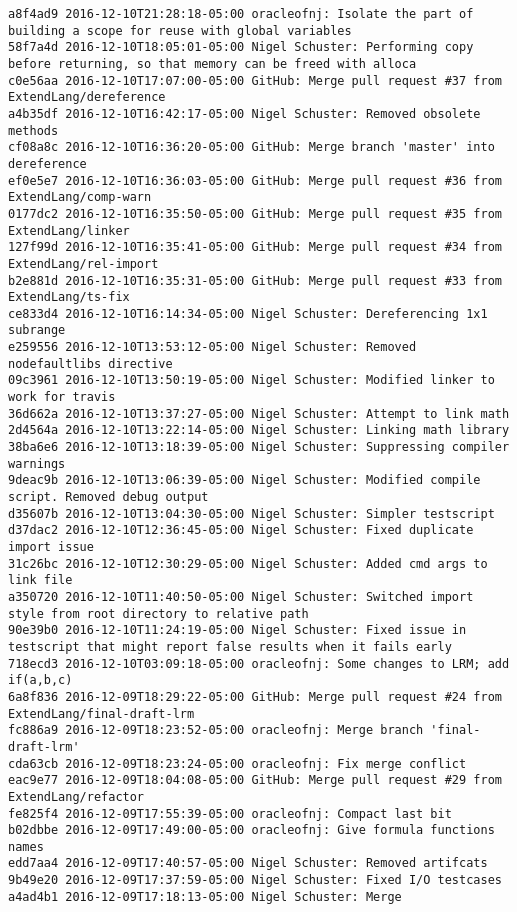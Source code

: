 \begin{lstlisting}
a8f4ad9 2016-12-10T21:28:18-05:00 oracleofnj: Isolate the part of building a scope for reuse with global variables
58f7a4d 2016-12-10T18:05:01-05:00 Nigel Schuster: Performing copy before returning, so that memory can be freed with alloca
c0e56aa 2016-12-10T17:07:00-05:00 GitHub: Merge pull request #37 from ExtendLang/dereference
a4b35df 2016-12-10T16:42:17-05:00 Nigel Schuster: Removed obsolete methods
cf08a8c 2016-12-10T16:36:20-05:00 GitHub: Merge branch 'master' into dereference
ef0e5e7 2016-12-10T16:36:03-05:00 GitHub: Merge pull request #36 from ExtendLang/comp-warn
0177dc2 2016-12-10T16:35:50-05:00 GitHub: Merge pull request #35 from ExtendLang/linker
127f99d 2016-12-10T16:35:41-05:00 GitHub: Merge pull request #34 from ExtendLang/rel-import
b2e881d 2016-12-10T16:35:31-05:00 GitHub: Merge pull request #33 from ExtendLang/ts-fix
ce833d4 2016-12-10T16:14:34-05:00 Nigel Schuster: Dereferencing 1x1 subrange
e259556 2016-12-10T13:53:12-05:00 Nigel Schuster: Removed nodefaultlibs directive
09c3961 2016-12-10T13:50:19-05:00 Nigel Schuster: Modified linker to work for travis
36d662a 2016-12-10T13:37:27-05:00 Nigel Schuster: Attempt to link math
2d4564a 2016-12-10T13:22:14-05:00 Nigel Schuster: Linking math library
38ba6e6 2016-12-10T13:18:39-05:00 Nigel Schuster: Suppressing compiler warnings
9deac9b 2016-12-10T13:06:39-05:00 Nigel Schuster: Modified compile script. Removed debug output
d35607b 2016-12-10T13:04:30-05:00 Nigel Schuster: Simpler testscript
d37dac2 2016-12-10T12:36:45-05:00 Nigel Schuster: Fixed duplicate import issue
31c26bc 2016-12-10T12:30:29-05:00 Nigel Schuster: Added cmd args to link file
a350720 2016-12-10T11:40:50-05:00 Nigel Schuster: Switched import style from root directory to relative path
90e39b0 2016-12-10T11:24:19-05:00 Nigel Schuster: Fixed issue in testscript that might report false results when it fails early
718ecd3 2016-12-10T03:09:18-05:00 oracleofnj: Some changes to LRM; add if(a,b,c)
6a8f836 2016-12-09T18:29:22-05:00 GitHub: Merge pull request #24 from ExtendLang/final-draft-lrm
fc886a9 2016-12-09T18:23:52-05:00 oracleofnj: Merge branch 'final-draft-lrm'
cda63cb 2016-12-09T18:23:24-05:00 oracleofnj: Fix merge conflict
eac9e77 2016-12-09T18:04:08-05:00 GitHub: Merge pull request #29 from ExtendLang/refactor
fe825f4 2016-12-09T17:55:39-05:00 oracleofnj: Compact last bit
b02dbbe 2016-12-09T17:49:00-05:00 oracleofnj: Give formula functions names
edd7aa4 2016-12-09T17:40:57-05:00 Nigel Schuster: Removed artifcats
9b49e20 2016-12-09T17:37:59-05:00 Nigel Schuster: Fixed I/O testcases
a4ad4b1 2016-12-09T17:18:13-05:00 Nigel Schuster: Merge

\end{lstlisting}
